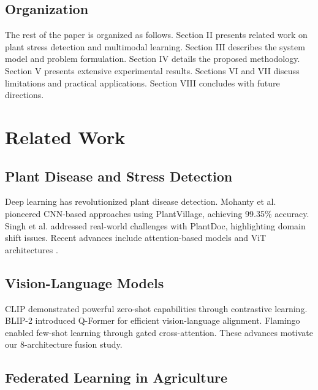 \documentclass[journal]{IEEEtran}
\begin{document}
\subsection{Organization}

The rest of the paper is organized as follows. Section II presents related work on plant stress detection and multimodal learning. Section III describes the system model and problem formulation. Section IV details the proposed methodology. Section V presents extensive experimental results. Sections VI and VII discuss limitations and practical applications. Section VIII concludes with future directions.

\section{Related Work}

\subsection{Plant Disease and Stress Detection}

Deep learning has revolutionized plant disease detection. Mohanty et al. \cite{plantvillage2016} pioneered CNN-based approaches using PlantVillage, achieving 99.35\% accuracy. Singh et al. \cite{plantdoc2019} addressed real-world challenges with PlantDoc, highlighting domain shift issues. Recent advances include attention-based models \cite{attention_plant2021} and ViT architectures \cite{vit_plant2022}.

\subsection{Vision-Language Models}

CLIP \cite{clip2021} demonstrated powerful zero-shot capabilities through contrastive learning. BLIP-2 \cite{blip2_2023} introduced Q-Former for efficient vision-language alignment. Flamingo \cite{flamingo2022} enabled few-shot learning through gated cross-attention. These advances motivate our 8-architecture fusion study.

\subsection{Federated Learning in Agriculture}
\end{document}

